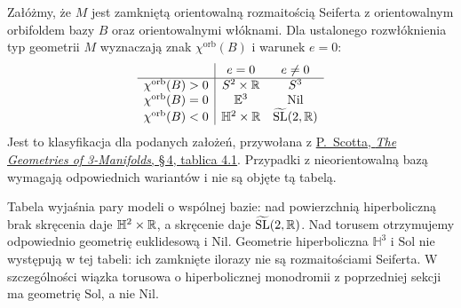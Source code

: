 \begin{twierdzenie}
\label{thm:thurston-seifert-table}
Załóżmy, że $M$ jest zamkniętą orientowalną rozmaitością
Seiferta z orientowalnym orbifoldem bazy $B$ oraz orientowalnymi
włóknami. Dla ustalonego rozwłóknienia typ geometrii $M$
wyznaczają znak $\chi^{\mathrm{orb}}(B)$ i warunek $e=0$:
\[
\begin{array}{c|cc}
 & e=0 & e\ne0\\ \hline
\chi^{\mathrm{orb}}(B)>0 & S^2\times\mathbb{R} & S^3\\
\chi^{\mathrm{orb}}(B)=0 & \mathbb E^3 & \mathrm{Nil}\\
\chi^{\mathrm{orb}}(B)<0 & \mathbb H^2\times\mathbb{R}
 & \widetilde{\mathrm{SL}}(2,\mathbb{R})
\end{array}
\]
Jest to klasyfikacja dla podanych założeń, przywołana z
\href{https://sschleimer.warwick.ac.uk/Teach/2021_3MFDS/References/1983the_geometries_of_three-manifolds.pdf}
{P.\ Scotta, \emph{The Geometries of 3-Manifolds}, \S\,4,
tablica 4.1}. Przypadki z nieorientowalną bazą wymagają
odpowiednich wariantów i nie są objęte tą tabelą.
\end{twierdzenie}

Tabela wyjaśnia pary modeli o wspólnej bazie: nad powierzchnią
hiperboliczną brak skręcenia daje
$\mathbb H^2\times\mathbb{R}$, a skręcenie daje
$\widetilde{\mathrm{SL}}(2,\mathbb{R})$. Nad torusem
otrzymujemy odpowiednio geometrię euklidesową i $\mathrm{Nil}$.
Geometrie hiperboliczna $\mathbb H^3$ i $\mathrm{Sol}$
nie występują w tej tabeli: ich zamknięte ilorazy nie są
rozmaitościami Seiferta. W szczególności wiązka torusowa
o hiperbolicznej monodromii z poprzedniej sekcji ma geometrię
$\mathrm{Sol}$, a nie $\mathrm{Nil}$.

